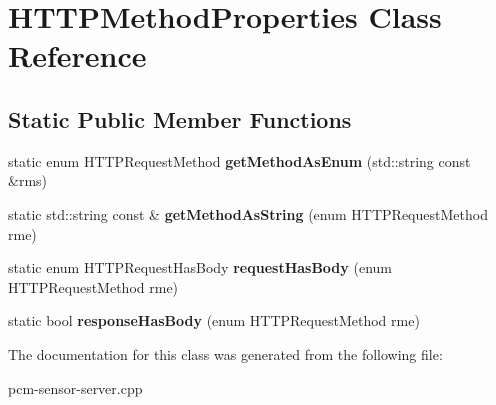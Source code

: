 \section{H\+T\+T\+P\+Method\+Properties Class Reference}
\label{classHTTPMethodProperties}
\subsection*{Static Public Member Functions}
\begin{DoxyCompactItemize}
\item 
\mbox{\label{classHTTPMethodProperties_a63f7b35c685ef08cbc34a07e567ddd87}} 
static enum H\+T\+T\+P\+Request\+Method {\bfseries get\+Method\+As\+Enum} (std\+::string const \&rms)
\item 
\mbox{\label{classHTTPMethodProperties_a681914e8ef27165ce42762b6660aaaa2}} 
static std\+::string const  \& {\bfseries get\+Method\+As\+String} (enum H\+T\+T\+P\+Request\+Method rme)
\item 
\mbox{\label{classHTTPMethodProperties_ae828011a50fdc4d39f3ea3eafac5ae20}} 
static enum H\+T\+T\+P\+Request\+Has\+Body {\bfseries request\+Has\+Body} (enum H\+T\+T\+P\+Request\+Method rme)
\item 
\mbox{\label{classHTTPMethodProperties_ab0c53d71fbbb65367f3fcc46e10f8116}} 
static bool {\bfseries response\+Has\+Body} (enum H\+T\+T\+P\+Request\+Method rme)
\end{DoxyCompactItemize}


The documentation for this class was generated from the following file\+:\begin{DoxyCompactItemize}
\item 
pcm-\/sensor-\/server.\+cpp\end{DoxyCompactItemize}
